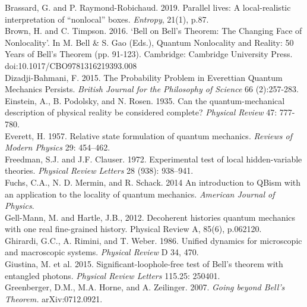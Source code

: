 \documentclass[a4paper]{article}
\begin{document}
Brassard, G. and P. Raymond-Robichaud. 2019. Parallel lives: A local-realistic interpretation of ``nonlocal'' boxes. \textit{Entropy}, 21(1), p.87.\\

Brown, H. and C. Timpson. 2016. `Bell on Bell's Theorem: The Changing Face of Nonlocality'. In M. Bell \& S. Gao (Eds.), Quantum Nonlocality and Reality: 50 Years of Bell's Theorem (pp. 91-123). Cambridge: Cambridge University Press. doi:10.1017/CBO9781316219393.008\\

Dizadji-Bahmani, F. 2015. The Probability Problem in Everettian Quantum Mechanics Persists.
\textit{British Journal for the Philosophy of Science} 66 (2):257-283.
\\


Einstein, A., B. Podolsky, and N. Rosen. 1935. Can the quantum-mechanical description of physical reality be considered complete? \textit{Physical Review} 47: 777-780.\\

Everett, H. 1957. Relative state formulation of quantum mechanics. \textit{Reviews of Modern Physics} 29: 454–462. \\

Freedman, S.J. and J.F. Clauser. 1972. Experimental test of local hidden-variable theories. \textit{Physical Review Letters} 28 (938): 938–941.\\

Fuchs, C.A., N. D. Mermin, and R. Schack.  2014 An introduction to QBism with an application to the locality of quantum mechanics. \textit{American Journal of Physics}.\\

Gell-Mann, M. and Hartle, J.B., 2012. Decoherent histories quantum mechanics with one real fine-grained history. Physical Review A, 85(6), p.062120.\\

Ghirardi, G.C., A. Rimini, and T. Weber. 1986. Unified dynamics for microscopic and macroscopic systems. \textit{Physical Review} D 34, 470.\\

Giustina, M. et al. 2015. Significant-loophole-free test of Bell’s theorem with entangled photons. \textit{Physical Review Letters} 115.25: 250401.\\

Greenberger, D.M., M.A. Horne, and A. Zeilinger. 2007. \textit{Going beyond Bell's Theorem.} arXiv:0712.0921.\\
\end{document}

